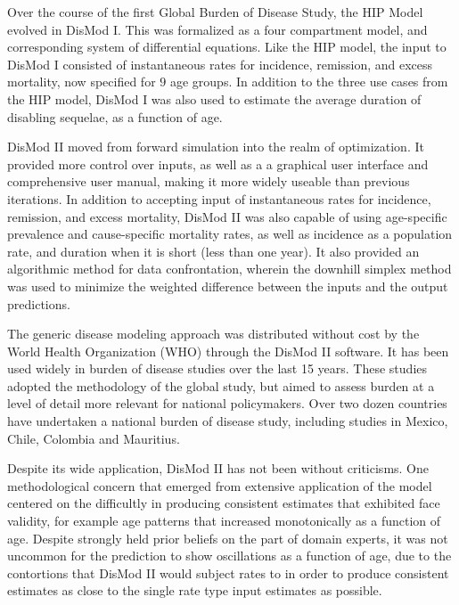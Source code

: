 Over the course of the first Global Burden of Disease Study, the HIP
Model evolved in DisMod I.\cite{Harvard_Global_1996} This was
formalized as a four compartment model, and corresponding system of
differential equations.  Like the HIP model, the input to DisMod I
consisted of instantaneous rates for incidence, remission, and excess
mortality, now specified for $9$ age groups.  In addition to the three
use cases from the HIP model, DisMod I was also used to estimate the
average duration of disabling sequelae, as a function of age.

DisMod II moved from forward simulation into the realm of
optimization.  It provided more control over inputs, as well as a a
graphical user interface and comprehensive user manual, making it more
widely useable than previous iterations.\cite{Barendregt_Generic_2003}
In addition to accepting input of instantaneous rates for incidence,
remission, and excess mortality, DisMod II was also capable of using
age-specific prevalence and cause-specific mortality rates, as well as
incidence as a population rate, and duration when it is short (less
than one year).  It also provided an algorithmic method for data
confrontation, wherein the downhill simplex method was used to
minimize the weighted difference between the inputs and the output
predictions.

The generic disease modeling approach was distributed without cost by
the World Health Organization (WHO) through the DisMod II software. It
has been used widely in burden of disease studies over the last 15
years. These studies adopted the methodology of the global study, but
aimed to assess burden at a level of detail more relevant for national
policymakers. Over two dozen countries have undertaken a national
burden of disease study, including studies in Mexico, Chile, Colombia
and
Mauritius.\cite{Lozano_Burden_1995,Concha_Carga_1996,Republica_Carga_1994,Vos_Mauritius_1996}

Despite its wide application, DisMod II has not been without
criticisms.  One methodological concern that emerged from extensive
application of the model centered on the difficultly in producing
consistent estimates that exhibited face validity, for example age
patterns that increased monotonically as a function of age. Despite
strongly held prior beliefs on the part of domain experts, it was not
uncommon for the prediction to show oscillations as a function of age, due
to the contortions that DisMod II would subject rates to in order to
produce consistent estimates as close to the single rate type input
estimates as possible.

